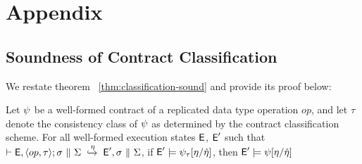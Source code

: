 \section{Appendix}
\label{sec:appendix}

\subsection{Soundness of Contract Classification} 

We restate theorem ~\ref{thm:classification-sound} and provide its proof
below:

\begin{theorem}
\label{lem:classification-sound}
Let $\psi$ be a well-formed contract of a replicated data type
operation $\mathit{op}$, and let $\tau$ denote the consistency class
of $\psi$ as determined by the contract classification scheme. For all
well-formed execution states ${\normalfont \textsf{E}}$, ${\normalfont \textsf{E}}'$ such that $\vdash {\normalfont \textsf{E}},\langle op,\tau \rangle;\sigma ~\|~ \Sigma \;\xhookrightarrow{\eta}\; {\normalfont \textsf{E}}', \sigma
~\|~ \Sigma$, if ${\normalfont \textsf{E}}' \models \psi_\tau[\eta/\hat{\eta}]$, then ${\normalfont \textsf{E}}'
\models \psi[\eta/\hat{\eta}]$
\end{theorem}
